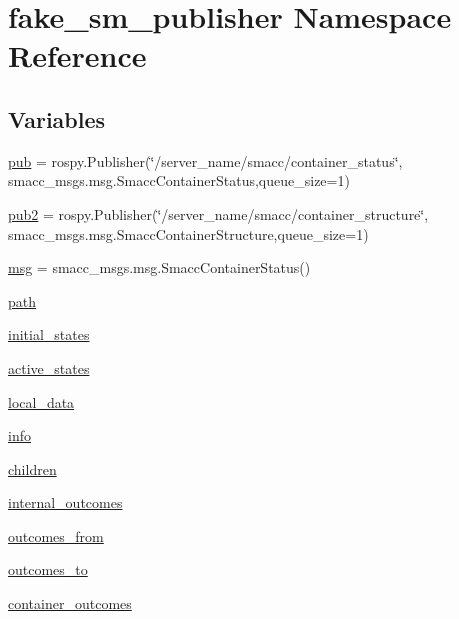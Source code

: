\hypertarget{namespacefake__sm__publisher}{}\section{fake\+\_\+sm\+\_\+publisher Namespace Reference}
\label{namespacefake__sm__publisher}
\subsection*{Variables}
\begin{DoxyCompactItemize}
\item 
\hyperlink{namespacefake__sm__publisher_a6d0a08eb0afa31b5b359db0f14543ef0}{pub} = rospy.\+Publisher(\char`\"{}/server\+\_\+name/smacc/container\+\_\+status\char`\"{}, smacc\+\_\+msgs.\+msg.\+Smacc\+Container\+Status,queue\+\_\+size=1)
\item 
\hyperlink{namespacefake__sm__publisher_ab0e2b6ebc8e615492c4c8d7e5d6d2338}{pub2} = rospy.\+Publisher(\char`\"{}/server\+\_\+name/smacc/container\+\_\+structure\char`\"{}, smacc\+\_\+msgs.\+msg.\+Smacc\+Container\+Structure,queue\+\_\+size=1)
\item 
\hyperlink{namespacefake__sm__publisher_abdcc720c2a46d017eab5ff36ecbe453b}{msg} = smacc\+\_\+msgs.\+msg.\+Smacc\+Container\+Status()
\item 
\hyperlink{namespacefake__sm__publisher_a6f260d72b657ebefffdec39c1fe6c012}{path}
\item 
\hyperlink{namespacefake__sm__publisher_a60e6f2714f247e58863960bdfa3a0fcc}{initial\+\_\+states}
\item 
\hyperlink{namespacefake__sm__publisher_ac6f3345f76de63e387bb2fba2f8fa332}{active\+\_\+states}
\item 
\hyperlink{namespacefake__sm__publisher_ae7bcc56d3653f72dbe5929768fe0d114}{local\+\_\+data}
\item 
\hyperlink{namespacefake__sm__publisher_ad0b9d5eac17e7b24dce6d1f07d55d585}{info}
\item 
\hyperlink{namespacefake__sm__publisher_af182a8a95f6299c8a2e9e2b1a026fb46}{children}
\item 
\hyperlink{namespacefake__sm__publisher_a3f2d98269f5961b0e70bfbb7855434f5}{internal\+\_\+outcomes}
\item 
\hyperlink{namespacefake__sm__publisher_a355cab829d8e0a4361917acecce8fe22}{outcomes\+\_\+from}
\item 
\hyperlink{namespacefake__sm__publisher_a6ae0e1e0afdba1d1e558ea87bf79df4c}{outcomes\+\_\+to}
\item 
\hyperlink{namespacefake__sm__publisher_adf5bac55bf7136288c34e47310c47be6}{container\+\_\+outcomes}
\end{DoxyCompactItemize}


